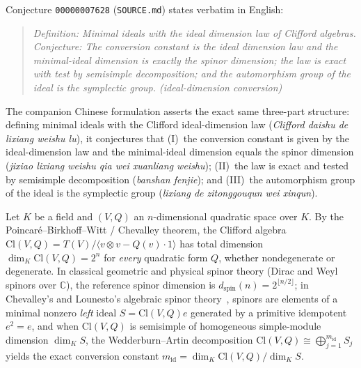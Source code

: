 \documentclass[11pt,a4paper]{article}
\theoremstyle{definition}
\newcommand{\Cl}{\mathrm{Cl}}
\begin{document}
Conjecture \texttt{00000007628} (\texttt{SOURCE.md}) states verbatim in English:
\begin{quote}
\emph{Definition: Minimal ideals with the ideal dimension law of Clifford algebras. Conjecture: The conversion constant is the ideal dimension law and the minimal-ideal dimension is exactly the spinor dimension; the law is exact with test by semisimple decomposition; and the automorphism group of the ideal is the symplectic group. (ideal-dimension conversion)}
\end{quote}
The companion Chinese formulation asserts the exact same three-part structure: defining minimal ideals with the Clifford ideal-dimension law (\emph{Clifford daishu de lixiang weishu lu}), it conjectures that (I)~the conversion constant is given by the ideal-dimension law and the minimal-ideal dimension equals the spinor dimension (\emph{jixiao lixiang weishu qia wei xuanliang weishu}); (II)~the law is exact and tested by semisimple decomposition (\emph{banshan fenjie}); and (III)~the automorphism group of the ideal is the symplectic group (\emph{lixiang de zitonggouqun wei xinqun}).

Let $K$ be a field and $(V, Q)$ an $n$-dimensional quadratic space over $K$. By the Poincar\'e--Birkhoff--Witt / Chevalley theorem, the Clifford algebra $\Cl(V, Q) = T(V)/\langle v \otimes v - Q(v)\cdot 1 \rangle$ has total dimension $\dim_K \Cl(V, Q) = 2^n$ for \emph{every} quadratic form $Q$, whether nondegenerate or degenerate. In classical geometric and physical spinor theory (Dirac and Weyl spinors over $\mathbb{C}$), the reference spinor dimension is $d_{\mathrm{spin}}(n) = 2^{\lfloor n/2 \rfloor}$; in Chevalley's and Lounesto's algebraic spinor theory~\cite{Chevalley1954,Lounesto2001}, spinors are elements of a minimal nonzero \emph{left} ideal $S = \Cl(V, Q)e$ generated by a primitive idempotent $e^2 = e$, and when $\Cl(V, Q)$ is semisimple of homogeneous simple-module dimension $\dim_K S$, the Wedderburn--Artin decomposition $\Cl(V, Q) \cong \bigoplus_{j=1}^{m_{\mathrm{id}}} S_j$ yields the exact conversion constant $m_{\mathrm{id}} = \dim_K \Cl(V, Q) / \dim_K S$.
\end{document}
